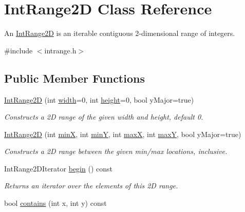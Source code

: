 \hypertarget{classIntRange2D}{}\section{Int\+Range2D Class Reference}
\label{classIntRange2D}


An \mbox{\hyperlink{classIntRange2D}{Int\+Range2D}} is an iterable contiguous 2-\/dimensional range of integers.  




{\ttfamily \#include $<$intrange.\+h$>$}

\subsection*{Public Member Functions}
\begin{DoxyCompactItemize}
\item 
\mbox{\hyperlink{classIntRange2D_a39f2016ab50300a0d0e76d60fe958356}{Int\+Range2D}} (int \mbox{\hyperlink{classIntRange2D_ad72663daf610f2a0833a2fc3d78e4fdf}{width}}=0, int \mbox{\hyperlink{classIntRange2D_ad3774f6419003470f54fd495124ef51f}{height}}=0, bool y\+Major=true)
\begin{DoxyCompactList}\small\item\em Constructs a 2D range of the given width and height, default 0. \end{DoxyCompactList}\item 
\mbox{\hyperlink{classIntRange2D_a22f22b7ce16863ba7acc111a2b26018b}{Int\+Range2D}} (int \mbox{\hyperlink{classIntRange2D_a1a1724b4b31e3d3d251e5816c7d9e448}{minX}}, int \mbox{\hyperlink{classIntRange2D_a2337641dec44ff553785d9c143c3aafd}{minY}}, int \mbox{\hyperlink{classIntRange2D_aa9493e60175cb4e130ae4cfba2b55907}{maxX}}, int \mbox{\hyperlink{classIntRange2D_a015dcf4989cbafff40d5a345b9d9f959}{maxY}}, bool y\+Major=true)
\begin{DoxyCompactList}\small\item\em Constructs a 2D range between the given min/max locations, inclusive. \end{DoxyCompactList}\item 
Int\+Range2\+D\+Iterator \mbox{\hyperlink{classIntRange2D_a5840f252f949c3f9c0bd1085250a8615}{begin}} () const
\begin{DoxyCompactList}\small\item\em Returns an iterator over the elements of this 2D range. \end{DoxyCompactList}\item 
bool \mbox{\hyperlink{classIntRange2D_a39725eb73188fbf2a4b790b1a6849815}{contains}} (int x, int y) const

\end{DoxyCompactItemize}
